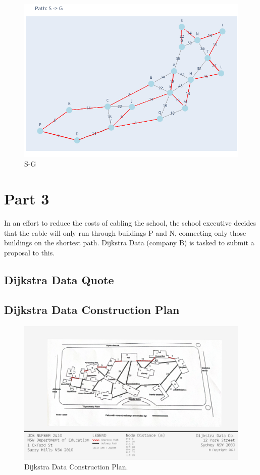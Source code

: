 \documentclass[11pt]{book}
\renewcommand{\=}[1]{\stackrel{#1}{=}} %
\theoremstyle{definition}
\theoremstyle{remark}
\begin{document}
\begin{figure}
    \centering
    \includegraphics[width=0.7\linewidth]{MSTpath/17.png}
    \caption{S-G}
    \label{fig:enter-label}
\end{figure}


\chapter{Part 3}
In an effort to reduce the costs of cabling the school, the school executive decides that the cable will only run through buildings P and N, connecting only those buildings on the shortest path.
Dijkstra Data (company B) is tasked to submit a proposal to this.

\section{Dijkstra Data Quote}


\section{Dijkstra Data Construction Plan}
\begin{figure}
    \centering
    \includegraphics[width=1\linewidth]{img/Dijkstra Data Plan.png}
    \caption{Dijkstra Data Construction Plan.}
    \label{fig:enter-label}
\end{figure}
\end{document}
